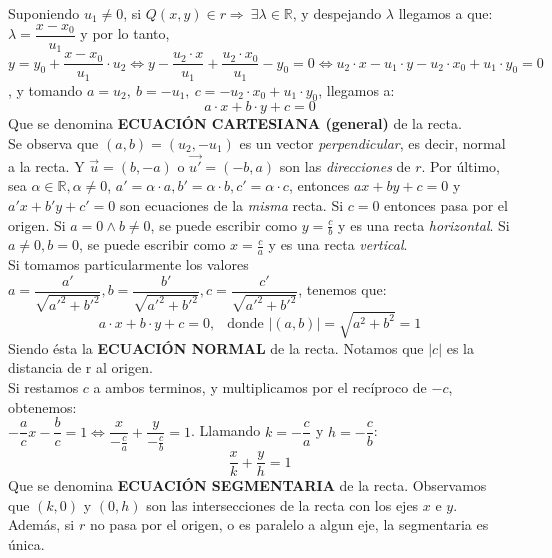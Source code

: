 \documentclass[11pt,a4paper]{article}
\begin{document}
\noindent Suponiendo $u_1\not=0$, si $Q(x,y)\in r \Rightarrow\ \exists \lambda \in \mathbb{R}$, y despejando $\lambda$ llegamos a que: $\lambda = \dfrac{x-x_0}{u_1}$ y por lo tanto, $y=y_0+\dfrac{x-x_0}{u_1}\cdot u_2 \iff y - \dfrac{u_2\cdot x}{u_1}+\dfrac{u_2\cdot x_0}{u_1}-y_0 = 0 \iff u_2\cdot x - u_1 \cdot y -u_2\cdot x_0 + u_1 \cdot y_0 = 0$, y tomando $a=u_2,\ b=-u_1,\ c=-u_2\cdot x_0 + u_1 \cdot y_0$, llegamos a:
\begin{equation}
a\cdot x+b\cdot y+c=0
\end{equation}
Que se denomina \textbf{ECUACI\'ON CARTESIANA (general)} de la recta.\\
Se observa que $(a,b) = (u_2,-u_1)$ es un vector \textit{perpendicular}, es decir, normal a la recta. Y $\overrightarrow{u} = (b,-a)$ o $\overrightarrow{u'} = (-b,a)$ son las \textit{direcciones} de $r$. Por \'ultimo, sea $\alpha \in \mathbb{R}, \alpha\not=0$, $a'=\alpha\cdot a, b'=\alpha\cdot b, c'=\alpha\cdot c$, entonces $ax+by+c=0$ y $a'x+b'y+c'=0$ son ecuaciones de la \textit{misma} recta. Si $c=0$ entonces pasa por el origen. Si $a=0\land b\not=0$, se puede escribir como $y=\frac{c}{b}$ y es una recta \textit{horizontal}. Si $a\not=0, b=0$, se puede escribir como $x=\frac{c}{a}$ y es una recta \textit{vertical}.\\

\noindent Si tomamos particularmente los valores $a=\dfrac{a'}{\sqrt{a'^2+b'^2}}, b=\dfrac{b'}{\sqrt{a'^2+b'^2}}, c=\dfrac{c'}{\sqrt{a'^2+b'^2}}$, tenemos que:
\begin{equation}
a\cdot x+b\cdot y + c = 0,\ \ \text{ donde } |(a,b)| = \sqrt{a^2+b^2} = 1
\end{equation}
Siendo \'esta la \textbf{ECUACI\'ON NORMAL} de la recta. Notamos que $|c|$ es la distancia de r al origen.\\

\noindent Si restamos $c$ a ambos terminos, y multiplicamos por el rec\'iproco de $-c$, obtenemos:\\ $-\dfrac{a}{c}x-\dfrac{b}{c}=1 \iff \dfrac{x}{-\frac{c}{a}} + \dfrac{y}{-\frac{c}{b}} = 1$. Llamando $k= -\dfrac{c}{a}$ y $h = -\dfrac{c}{b}$:
\begin{equation}
\dfrac{x}{k} + \dfrac{y}{h} = 1
\end{equation}
\noindent Que se denomina \textbf{ECUACI\'ON SEGMENTARIA} de la recta. Observamos que $(k,0)$ y $(0,h)$ son las intersecciones de la recta con los ejes $x$ e $y$. Adem\'as, si $r$ no pasa por el origen, o es paralelo a algun eje, la segmentaria es \'unica.\\
\end{document}
